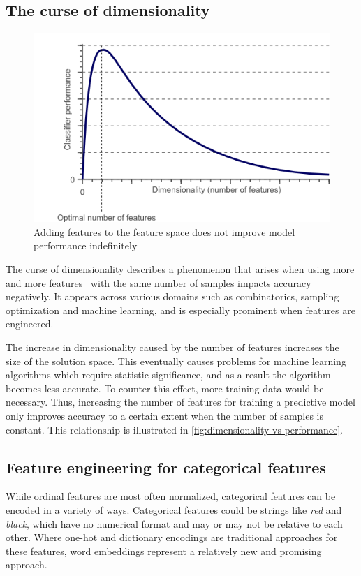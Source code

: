 \subsection{The curse of dimensionality}\label{sec:background:curse-of-dimensionality}
\begin{figure}
    \centering
    \includegraphics[width=.75\textwidth]{gfx/dimensionality_vs_performance.png}
    \caption[A visualization of the curse of dimensionality]{Adding features to the feature space does not improve model performance indefinitely}
    \label{fig:dimensionality-vs-performance}
\end{figure}
The curse of dimensionality describes a phenomenon that arises when using more and more features~\cite{Aalst2016} with the same number of samples impacts accuracy negatively. It appears across various domains such as combinatorics, sampling optimization and machine learning, and is especially prominent when features are engineered.

The increase in dimensionality caused by the number of features increases the size of the solution space. This eventually causes problems for machine learning algorithms which require statistic significance, and as a result the algorithm becomes less accurate. To counter this effect, more training data would be necessary. Thus, increasing the number of features for training a predictive model only improves accuracy to a certain extent when the number of samples is constant. This relationship is illustrated in \autoref{fig:dimensionality-vs-performance}.

\subsection{Feature engineering for categorical features}\label{sec:categorical-feature-engineering}
While ordinal features are most often normalized, categorical features can be encoded in a variety of ways. Categorical features could be strings like \textit{red} and \textit{black}, which have no numerical format and may or may not be relative to each other. Where one-hot and dictionary encodings are traditional approaches for these features, word embeddings represent a relatively new and promising approach.

